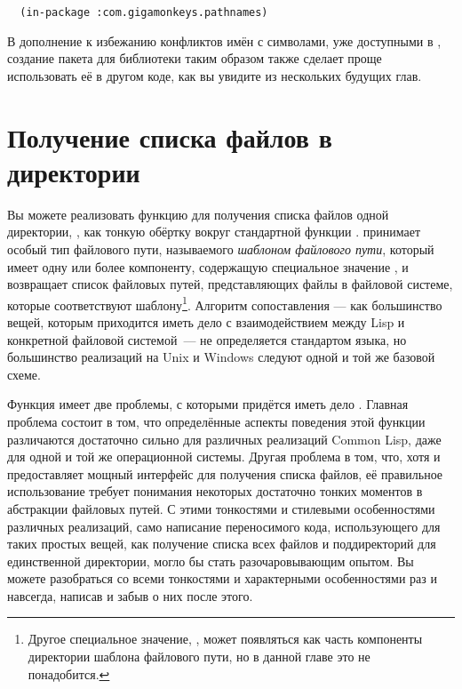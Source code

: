 \begin{lstlisting}
  (in-package :com.gigamonkeys.pathnames)
\end{lstlisting}

В дополнение к избежанию конфликтов имён с символами, уже доступными в ,
создание пакета для библиотеки таким образом также сделает проще использовать её в другом
коде, как вы увидите из нескольких будущих глав.


\section{Получение списка файлов в директории}

Вы можете реализовать функцию для получения списка файлов одной директории,
, как тонкую обёртку вокруг стандартной функции
.  принимает особый тип файлового пути, называемого
\textit{шаблоном файлового пути}, который имеет одну или более компоненту, содержащую
специальное значение , и возвращает список файловых путей, представляющих
файлы в файловой системе, которые соответствуют шаблону\footnote{Другое специальное
  значение, , может появляться как часть компоненты директории
  шаблона файлового пути, но в данной главе это не понадобится.}. Алгоритм сопоставления ---
как большинство вещей, которым приходится иметь дело с взаимодействием между Lisp и
конкретной файловой системой~--- не определяется стандартом языка, но большинство реализаций
на Unix и Windows следуют одной и той же базовой схеме.

Функция  имеет две проблемы, с которыми придётся иметь дело
. Главная проблема состоит в том, что определённые аспекты поведения
этой функции различаются достаточно сильно для различных реализаций Common Lisp, даже для
одной и той же операционной системы. Другая проблема в том, что, хотя  и
предоставляет мощный интерфейс для получения списка файлов, её правильное использование
требует понимания некоторых достаточно тонких моментов в абстракции файловых путей. С
этими тонкостями и стилевыми особенностями различных реализаций, само написание
переносимого кода, использующего  для таких простых вещей, как получение
списка всех файлов и поддиректорий для единственной директории, могло бы стать
разочаровывающим опытом. Вы можете разобраться со всеми тонкостями и характерными
особенностями раз и навсегда, написав  и забыв о них после этого.

